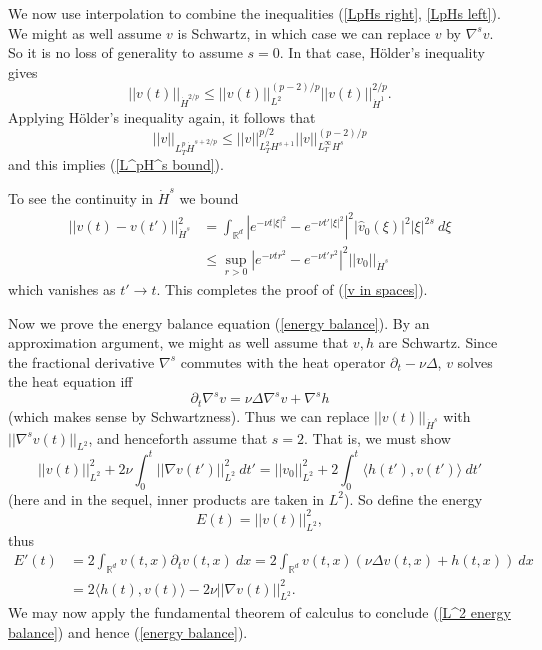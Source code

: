 \documentclass[10pt]{article}
\newcommand{\RR}{\mathbb{R}}
\theoremstyle{definition}
\begin{document}
We now use interpolation to combine the inequalities (\ref{LpHs right}, \ref{LpHs left}).
We might as well assume $v$ is Schwartz, in which case we can replace $v$ by $\nabla^s v$.
So it is no loss of generality to assume $s = 0$. In that case, H\"older's inequality gives
$$||v(t)||_{\dot H^{2/p}} \leq ||v(t)||_{L^2}^{(p-2)/p} ||v(t)||_{\dot H^1}^{2/p}.$$
Applying H\"older's inequality again, it follows that
$$||v||_{L^p_T \dot H^{s + 2/p}} \leq ||v||_{L^2_T H^{s + 1}}^{p/2} ||v||_{L^\infty_T H^s}^{(p-2)/p}$$
and this implies (\ref{L^pH^s bound}).

To see the continuity in $\dot H^s$ we bound
\begin{align*}
||v(t) - v(t')||_{\dot H^s}^2 &= \int_{\RR^d} \left|e^{-\nu t|\xi|^2} - e^{-\nu t'|\xi|^2}\right|^2 |\hat v_0(\xi)|^2 |\xi|^{2s} ~d\xi\\
&\leq \sup_{r > 0} \left|e^{-\nu tr^2} - e^{-\nu t'r^2}\right|^2 ||v_0||_{\dot H^s}
\end{align*}
which vanishes as $t' \to t$. This completes the proof of (\ref{v in spaces}).

Now we prove the energy balance equation (\ref{energy balance}).
By an approximation argument, we might as well assume that $v,h$ are Schwartz.
Since the fractional derivative $\nabla^s$ commutes with the heat operator $\partial_t - \nu \Delta$, $v$ solves the heat equation iff
$$\partial_t \nabla^s v = \nu \Delta \nabla^s v + \nabla^s h$$
(which makes sense by Schwartzness). Thus we can replace $||v(t)||_{\dot H^s}$ with $||\nabla^s v(t)||_{L^2}$, and henceforth assume that $s = 2$.
That is, we must show
\begin{equation}
\label{L^2 energy balance}
||v(t)||_{L^2}^2 + 2\nu\int_0^t ||\nabla v(t')||_{L^2}^2 ~dt' = ||v_0||_{L^2}^2 + 2\int_0^t \langle h(t'), v(t')\rangle ~dt'
\end{equation}
(here and in the sequel, inner products are taken in $L^2$).
So define the energy
$$E(t) = ||v(t)||_{L^2}^2,$$
thus
\begin{align*}
E'(t) &= 2\int_{\RR^d} v(t, x) \partial_t v(t, x) ~dx = 2\int_{\RR^d} v(t, x)(\nu \Delta v(t, x) + h(t, x)) ~dx\\
&= 2\langle h(t), v(t)\rangle -2\nu ||\nabla v(t)||_{L^2}^2.
\end{align*}
We may now apply the fundamental theorem of calculus to conclude (\ref{L^2 energy balance}) and hence (\ref{energy balance}).
\end{document}
